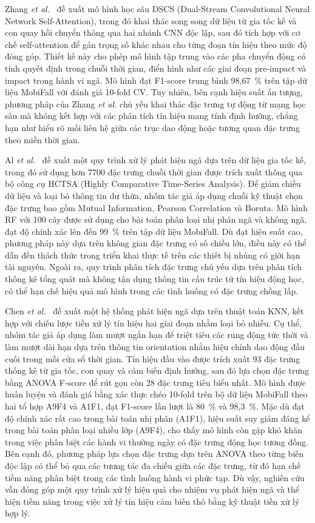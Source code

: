 Zhang \textit{et al.}~\cite{zhang2024effective} đề xuất mô hình học sâu DSCS (Dual-Stream Convolutional Neural Network Self-Attention), trong đó khai thác song song dữ liệu từ gia tốc kế và con quay hồi chuyển thông qua hai nhánh CNN độc lập, sau đó tích hợp với cơ chế self-attention để gán trọng số khác nhau cho từng đoạn tín hiệu theo mức độ đóng góp. Thiết kế này cho phép mô hình tập trung vào các pha chuyển động có tính quyết định trong chuỗi thời gian, điển hình như các giai đoạn pre-impact và impact trong hành vi ngã. Mô hình đạt F1-score trung bình 98,67~\% trên tập dữ liệu MobiFall với đánh giá 10-fold CV. Tuy nhiên, bên cạnh hiệu suất ấn tượng, phương pháp của Zhang \textit{et al.} chủ yếu khai thác đặc trưng tự động từ mạng học sâu mà không kết hợp với các phân tích tín hiệu mang tính định hướng, chẳng hạn như hiểu rõ mối liên hệ giữa các trục dao động hoặc tương quan đặc trưng theo miền thời gian.

Al \textit{et al.}~\cite{al2021towards} đề xuất một quy trình xử lý phát hiện ngã dựa trên dữ liệu gia tốc kế, trong đó sử dụng hơn 7700 đặc trưng chuỗi thời gian được trích xuất thông qua bộ công cụ HCTSA (Highly Comparative Time-Series Analysis). Để giảm chiều dữ liệu và loại bỏ thông tin dư thừa, nhóm tác giả áp dụng chuỗi kỹ thuật chọn đặc trưng bao gồm Mutual Information, Pearson Correlation và Boruta. Mô hình RF với 100 cây được sử dụng cho bài toán phân loại nhị phân ngã và không ngã, đạt độ chính xác lên đến 99~\% trên tập dữ liệu MobiFall. Dù đạt hiệu suất cao, phương pháp này dựa trên không gian đặc trưng có số chiều lớn, điều này có thể dẫn đến thách thức trong triển khai thực tế trên các thiết bị nhúng có giới hạn tài nguyên. Ngoài ra, quy trình phân tích đặc trưng chủ yếu dựa trên phân tích thống kê tổng quát mà không tận dụng thông tin cấu trúc từ tín hiệu động học, có thể hạn chế hiệu quả mô hình trong các tình huống có đặc trưng chồng lấp.

Chen \textit{et al.}~\cite{chen2019detection} đề xuất một hệ thống phát hiện ngã dựa trên thuật toán KNN, kết hợp với chiến lược tiền xử lý tín hiệu hai giai đoạn nhằm loại bỏ nhiễu. Cụ thể, nhóm tác giả áp dụng làm mượt ngắn hạn để triệt tiêu các rung động tức thời và làm mượt dài hạn dựa trên thông tin orientation nhằm hiệu chỉnh dao động đầu cuối trong mỗi cửa sổ thời gian. Tín hiệu đầu vào được trích xuất 93 đặc trưng thống kê từ gia tốc, con quay và cảm biến định hướng, sau đó lựa chọn đặc trưng bằng ANOVA F-score để rút gọn còn 28 đặc trưng tiêu biểu nhất. Mô hình được huấn luyện và đánh giá bằng xác thực chéo 10-fold trên bộ dữ liệu MobiFall theo hai tổ hợp A9F4 và A1F1, đạt F1-score lần lượt là 80~\% và 98,3~\%. Mặc dù đạt độ chính xác rất cao trong bài toán nhị phân (A1F1), hiệu suất suy giảm đáng kể trong bài toán phân loại nhiều lớp (A9F4), cho thấy mô hình còn gặp khó khăn trong việc phân biệt các hành vi thường ngày có đặc trưng động học tương đồng. Bên cạnh đó, phương pháp lựa chọn đặc trưng dựa trên ANOVA theo từng biến độc lập có thể bỏ qua các tương tác đa chiều giữa các đặc trưng, từ đó hạn chế tiềm năng phân biệt trong các tình huống hành vi phức tạp. Dù vậy, nghiên cứu vẫn đóng góp một quy trình xử lý hiệu quả cho nhiệm vụ phát hiện ngã và thể hiện tiềm năng trong việc xử lý tín hiệu cảm biến thô bằng kỹ thuật tiền xử lý hợp lý.


